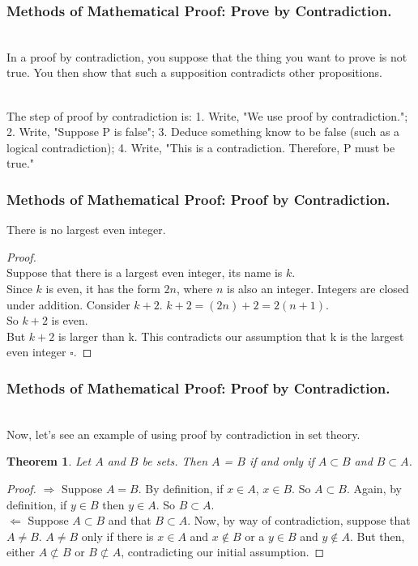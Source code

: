 \documentclass[aspectratio=169, handout]{beamer}
\newtheorem{thm}{Theorem}
\numberwithin{equation}{section}
\begin{document}
\begin{frame}
\frametitle{Methods of Mathematical Proof: Prove by Contradiction.}

\ \\In a proof by contradiction, you suppose that the thing you want to prove is not true.  You then show that such a supposition contradicts other propositions. \pause

\ \\The step of proof by contradiction is: 1. Write, "We use proof by contradiction."; 2. Write, "Suppose P is false"; 3. Deduce something know to be false (such as a logical contradiction); 4. Write, "This is a contradiction. Therefore, P must be true."

\end{frame}

\begin{frame}
\frametitle{Methods of Mathematical Proof: Proof by Contradiction.}

\begin{theorem}
There is no largest even integer.
\end{theorem}

\begin{proof}
\ \\Suppose that there is a largest even integer, its name is $k$. \pause
\ \\Since $k$ is even, it has the form $2n$, where $n$ is also an integer. \pause Integers are closed under addition.  Consider $k + 2$. $k + 2 = (2n) + 2 = 2 (n + 1)$. \pause
\ \\So $k + 2$ is even. \pause
\ \\But $k + 2$ is larger than k. This contradicts our assumption that k is the largest even integer $\square$.
\end{proof}

\end{frame}



\begin{frame}
\frametitle{Methods of Mathematical Proof: Proof by Contradiction.}

\ \\Now, let's see an example of using proof by contradiction in set theory. \pause

\begin{thm} Let $A$ and $B$ be sets.  Then $A$ = $B$ if and only if $A \subset B$ and $B \subset A$. \end{thm} \pause
\begin{proof} $\Rightarrow$ Suppose $A = B$.  By definition, if $x \in A$, $x \in B$.  So $A \subset B$.  Again, by definition, if $y \in B$ then $y \in A$.  So $B \subset A$. \pause  \\
$\Leftarrow$ Suppose $A \subset B$  and that $B \subset A$. \pause Now, by way of contradiction, suppose that $A \ne B$.  \pause $A \ne B$ only if there is $x \in A $ and $x \notin B$ or a $y \in B$ and $y \notin A$.  \pause But then, either $A \not\subset B$ or $B \not\subset A$, contradicting our initial assumption.
\end{proof}

\end{frame}
\end{document}
